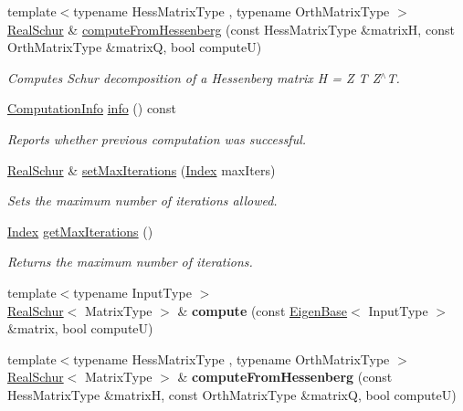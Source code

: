 \begin{DoxyCompactItemize}
{\footnotesize template$<$typename Hess\+Matrix\+Type , typename Orth\+Matrix\+Type $>$ }\\\mbox{\hyperlink{class_eigen_1_1_real_schur}{Real\+Schur}} \& \mbox{\hyperlink{class_eigen_1_1_real_schur_ac4acc917dcaddefae5f35acd2c536d65}{compute\+From\+Hessenberg}} (const Hess\+Matrix\+Type \&matrixH, const Orth\+Matrix\+Type \&matrixQ, bool computeU)
\begin{DoxyCompactList}\small\item\em Computes Schur decomposition of a Hessenberg matrix H = Z T Z$^\wedge$T. \end{DoxyCompactList}\item 
\mbox{\hyperlink{group__enums_ga85fad7b87587764e5cf6b513a9e0ee5e}{Computation\+Info}} \mbox{\hyperlink{class_eigen_1_1_real_schur_a386fd2b1a3a8401eca7183ac074deec8}{info}} () const
\begin{DoxyCompactList}\small\item\em Reports whether previous computation was successful. \end{DoxyCompactList}\item 
\mbox{\hyperlink{class_eigen_1_1_real_schur}{Real\+Schur}} \& \mbox{\hyperlink{class_eigen_1_1_real_schur_ad189e8776ee20a12046694f98b354322}{set\+Max\+Iterations}} (\mbox{\hyperlink{class_eigen_1_1_real_schur_a8bd4653e2d9569a44ecc95e746422d3f}{Index}} max\+Iters)
\begin{DoxyCompactList}\small\item\em Sets the maximum number of iterations allowed. \end{DoxyCompactList}\item 
\mbox{\label{class_eigen_1_1_real_schur_a99453076a9617a6af353b5b1f3220c25}} 
\mbox{\hyperlink{class_eigen_1_1_real_schur_a8bd4653e2d9569a44ecc95e746422d3f}{Index}} \mbox{\hyperlink{class_eigen_1_1_real_schur_a99453076a9617a6af353b5b1f3220c25}{get\+Max\+Iterations}} ()
\begin{DoxyCompactList}\small\item\em Returns the maximum number of iterations. \end{DoxyCompactList}\item 
\mbox{\label{class_eigen_1_1_real_schur_aa6d762f59f27cfbe33db709a2e0a2ba1}} 
{\footnotesize template$<$typename Input\+Type $>$ }\\\mbox{\hyperlink{class_eigen_1_1_real_schur}{Real\+Schur}}$<$ Matrix\+Type $>$ \& {\bfseries compute} (const \mbox{\hyperlink{struct_eigen_1_1_eigen_base}{Eigen\+Base}}$<$ Input\+Type $>$ \&matrix, bool computeU)
\item 
\mbox{\label{class_eigen_1_1_real_schur_a26f621f7dc83eed739b739ad5d73f0bd}} 
{\footnotesize template$<$typename Hess\+Matrix\+Type , typename Orth\+Matrix\+Type $>$ }\\\mbox{\hyperlink{class_eigen_1_1_real_schur}{Real\+Schur}}$<$ Matrix\+Type $>$ \& {\bfseries compute\+From\+Hessenberg} (const Hess\+Matrix\+Type \&matrixH, const Orth\+Matrix\+Type \&matrixQ, bool computeU)
\end{DoxyCompactItemize}
